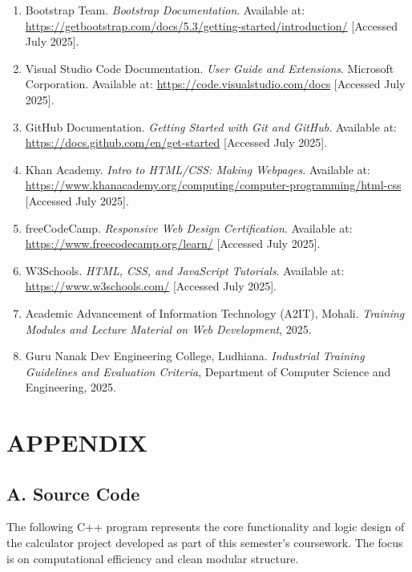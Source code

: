 \documentclass[a4paper,12pt,oneside]{report}
\numberwithin{equation}{chapter}
\numberwithin{figure}{chapter}
\numberwithin{table}{chapter}
\begin{document}
\begin{enumerate}
    \item Bootstrap Team. \textit{Bootstrap Documentation}. Available at: \url{https://getbootstrap.com/docs/5.3/getting-started/introduction/} [Accessed July 2025].

    \item Visual Studio Code Documentation. \textit{User Guide and Extensions}. Microsoft Corporation. Available at: \url{https://code.visualstudio.com/docs} [Accessed July 2025].

    \item GitHub Documentation. \textit{Getting Started with Git and GitHub}. Available at: \url{https://docs.github.com/en/get-started} [Accessed July 2025].

    \item Khan Academy. \textit{Intro to HTML/CSS: Making Webpages}. Available at: \url{https://www.khanacademy.org/computing/computer-programming/html-css} [Accessed July 2025].

    \item freeCodeCamp. \textit{Responsive Web Design Certification}. Available at: \url{https://www.freecodecamp.org/learn/} [Accessed July 2025].

    \item W3Schools. \textit{HTML, CSS, and JavaScript Tutorials}. Available at: \url{https://www.w3schools.com/} [Accessed July 2025].

    \item Academic Advancement of Information Technology (A2IT), Mohali. \textit{Training Modules and Lecture Material on Web Development}, 2025.

    \item Guru Nanak Dev Engineering College, Ludhiana. \textit{Industrial Training Guidelines and Evaluation Criteria}, Department of Computer Science and Engineering, 2025.
\end{enumerate}

\appendix
\chapter*{APPENDIX}

\section*{A. Source Code}

The following C++ program represents the core functionality and logic design of the calculator project developed as part of this semester’s coursework. The focus is on computational efficiency and clean modular structure.
\end{document}
